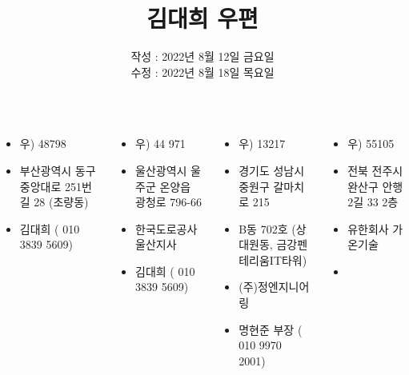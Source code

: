\documentclass[	20pt, 
							a1paper, 
							portrait, %
							margin=0mm, %
							innermargin=10mm,  		%
							blockverticalspace=4mm, %
							colspace=5mm, 
							subcolspace=0mm
							]{tikzposter}
\title{김대희 우편 }
\author{ 	작성 : 2022년 8월 12일 금요일 \\
				수정 : 2022년 8월 18일 목요일 }
\begin{document}
	\maketitle

	\begin{columns}


			{
				\begin{LARGE}
					\begin{itemize}
					\item 우)  48798
					\item 부산광역시 동구 중앙대로 251번길 28 (초량동)
					\item 김대희 ( 010 3839 5609)
					\end{itemize}
				\end{LARGE}
			}


			{
				\begin{LARGE}
					\begin{itemize}
					\item 우)  44 971
					\item 울산광역시 울주군 온양읍 광청로 796-66
					\item 한국도로공사 울산지사 
					\item 김대희 ( 010 3839 5609)
					\end{itemize}
				\end{LARGE}
			}

			{
				\begin{LARGE}
					\begin{itemize}
					\item 우) 13217
					\item 경기도 성남시 중원구 갈마치로 215
					\item B동 702호 (상대원동, 금강펜테리움IT타워)
					\item (주)정엔지니어링
					\item 명현준 부장 ( 010 9970 2001)
					\end{itemize}
				\end{LARGE}
			}


			{
				\begin{LARGE}
					\begin{itemize}
					\item 우) 55105
					\item 전북 전주시 완산구 안행2길 33 2층
					\item 유한회사 가온기술 
					\item 
					\end{itemize}
				\end{LARGE}
			}







\end{columns}
\end{document}
